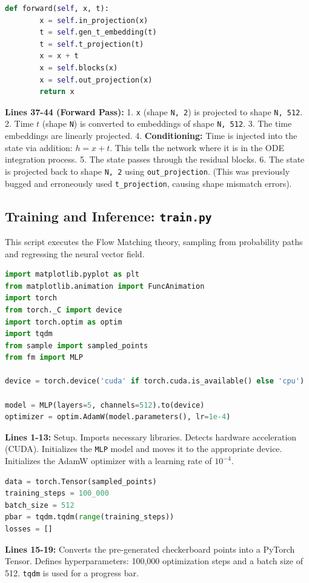 \documentclass[12pt]{article}
\begin{document}
\begin{lstlisting}[language=Python]
    def forward(self, x, t):
        x = self.in_projection(x)
        t = self.gen_t_embedding(t)
        t = self.t_projection(t)
        x = x + t
        x = self.blocks(x)
        x = self.out_projection(x)
        return x
\end{lstlisting}
\textbf{Lines 37-44 (Forward Pass):}
1. \texttt{x} (shape \texttt{N, 2}) is projected to shape \texttt{N, 512}.
2. Time $t$ (shape \texttt{N}) is converted to embeddings of shape \texttt{N, 512}.
3. The time embeddings are linearly projected.
4. \textbf{Conditioning:} Time is injected into the state via addition: $h = x + t$. This tells the network where it is in the ODE integration process.
5. The state passes through the residual blocks.
6. The state is projected back to shape \texttt{N, 2} using \texttt{out\_projection}. (This was previously bugged and erroneously used \texttt{t\_projection}, causing shape mismatch errors).

\newpage
\subsection{Training and Inference: \texttt{train.py}}
This script executes the Flow Matching theory, sampling from probability paths and regressing the neural vector field.

\begin{lstlisting}[language=Python]
import matplotlib.pyplot as plt
from matplotlib.animation import FuncAnimation
import torch
from torch._C import device
import torch.optim as optim
import tqdm
from sample import sampled_points
from fm import MLP

device = torch.device('cuda' if torch.cuda.is_available() else 'cpu')

model = MLP(layers=5, channels=512).to(device)
optimizer = optim.AdamW(model.parameters(), lr=1e-4)
\end{lstlisting}
\textbf{Lines 1-13:} Setup. Imports necessary libraries. Detects hardware acceleration (CUDA). Initializes the \texttt{MLP} model and moves it to the appropriate device. Initializes the AdamW optimizer with a learning rate of $10^{-4}$.

\begin{lstlisting}[language=Python]
data = torch.Tensor(sampled_points)
training_steps = 100_000
batch_size = 512
pbar = tqdm.tqdm(range(training_steps))
losses = []
\end{lstlisting}
\textbf{Lines 15-19:} Converts the pre-generated checkerboard points into a PyTorch Tensor. Defines hyperparameters: 100,000 optimization steps and a batch size of 512. \texttt{tqdm} is used for a progress bar.
\end{document}
